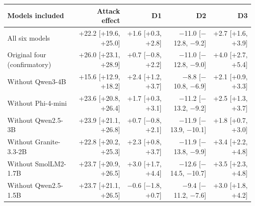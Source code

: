 \begin{tabular}{@{}lrrrr@{}}
\toprule
Models included & Attack effect & D1 & D2 & D3 \\
\midrule
All six models & +22.2 [+19.6, +25.0] & +1.6 [+0.3, +2.8] & $-$11.0 [$-$12.8, $-$9.2] & +2.7 [+1.6, +3.9] \\
Original four (confirmatory) & +26.0 [+23.1, +28.9] & +0.7 [$-$0.8, +2.2] & $-$11.0 [$-$12.8, $-$9.0] & +4.0 [+2.7, +5.4] \\
\midrule
Without Qwen3-4B & +15.6 [+12.9, +18.2] & +2.4 [+1.2, +3.7] & $-$8.8 [$-$10.8, $-$6.9] & +2.1 [+0.9, +3.3] \\
Without Phi-4-mini & +23.6 [+20.8, +26.4] & +1.7 [+0.3, +3.1] & $-$11.2 [$-$13.2, $-$9.2] & +2.5 [+1.3, +3.7] \\
Without Qwen2.5-3B & +23.9 [+21.1, +26.8] & +0.7 [$-$0.8, +2.1] & $-$11.9 [$-$13.9, $-$10.1] & +1.8 [+0.7, +3.0] \\
Without Granite-3.3-2B & +22.8 [+20.2, +25.3] & +2.3 [+0.8, +3.7] & $-$11.9 [$-$13.8, $-$9.9] & +3.4 [+2.2, +4.8] \\
Without SmolLM2-1.7B & +23.7 [+20.9, +26.5] & +3.0 [+1.7, +4.4] & $-$12.6 [$-$14.5, $-$10.7] & +3.5 [+2.3, +4.8] \\
Without Qwen2.5-1.5B & +23.7 [+21.1, +26.5] & $-$0.6 [$-$1.8, +0.7] & $-$9.4 [$-$11.2, $-$7.6] & +3.0 [+1.8, +4.2] \\
\bottomrule
\end{tabular}